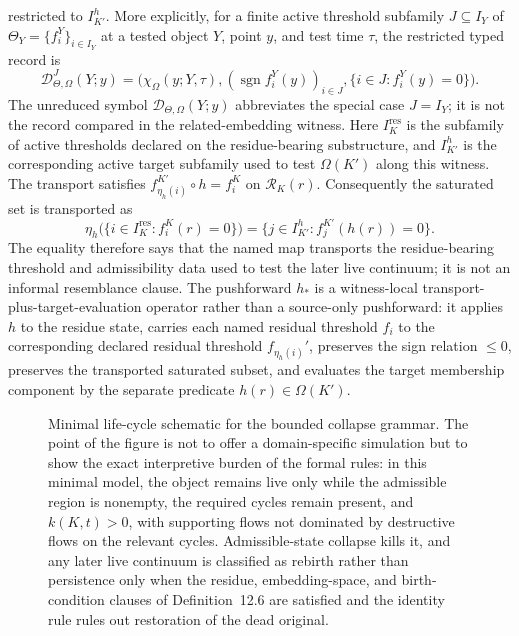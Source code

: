 restricted to \(I_{K'}^{h}\). More explicitly, for a finite active threshold
subfamily \(J\subseteq I_Y\) of
\(\Theta_Y=\{f_i^Y\}_{i\in I_Y}\) at a tested object \(Y\), point \(y\), and
test time \(\tau\), the
restricted typed record is
\[
  \mathcal{D}^{J}_{\Theta,\Omega}(Y;y)=
  \big(
    \chi_{\Omega}(y;Y,\tau),
    (\operatorname{sgn} f_i^Y(y))_{i\in J},
    \{i\in J:f_i^Y(y)=0\}
  \big).
\]
The unreduced symbol \(\mathcal{D}_{\Theta,\Omega}(Y;y)\) abbreviates the
special case \(J=I_Y\); it is not the record compared in the related-embedding
witness.
Here \(I_K^{\mathrm{res}}\) is the subfamily of active thresholds declared on
the residue-bearing substructure, and \(I_{K'}^{h}\) is the corresponding
active target subfamily used to test \(\Omega(K')\) along this witness. The
transport satisfies
\(f_{\eta_h(i)}^{K'}\circ h=f_i^K\) on \(\mathcal{R}_K(r)\).
Consequently the saturated set is transported as
\[
  \eta_h\bigl(\{i\in I_K^{\mathrm{res}}:f_i^K(r)=0\}\bigr)
  =
  \{j\in I_{K'}^{h}:f_j^{K'}(h(r))=0\}.
\]
The equality therefore says that the named map
transports the residue-bearing threshold and admissibility data used to test
the later live continuum; it is not an informal resemblance clause. The
pushforward \(h_{\ast}\) is a witness-local transport-plus-target-evaluation
operator rather than a source-only pushforward: it applies \(h\) to the residue
state, carries each named residual threshold \(f_i\) to the corresponding
declared residual threshold \(f_{\eta_h(i)}'\), preserves the sign relation
\(\le 0\), preserves the transported saturated subset, and evaluates the
target membership component by the separate predicate
\(h(r)\in\Omega(K')\).

\begin{figure}[htbp]
\centering

\caption{Minimal life-cycle schematic for the bounded collapse grammar. The point of the figure is
not to offer a domain-specific simulation but to show the exact interpretive burden of the formal
rules: in this minimal model, the object remains live only while the
admissible region is nonempty, the required cycles remain present, and
\(k(K,t)>0\), with supporting flows not dominated by destructive flows on the
relevant cycles. Admissible-state collapse kills it, and any later live continuum
is classified as rebirth rather than persistence only when the residue,
embedding-space, and birth-condition clauses of Definition~12.6 are satisfied
and the identity rule rules out restoration of the dead original.}
\label{fig:oc13-birth-life-death}
\end{figure}

